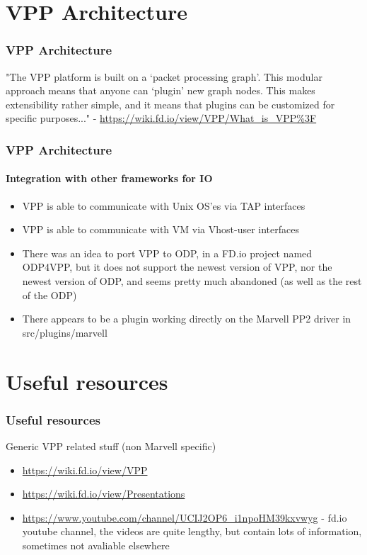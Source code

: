 \documentclass{beamer}
\begin{document}
\section{VPP Architecture}
  \begin{frame}
  \frametitle{VPP Architecture}
  "The VPP platform is built on a ‘packet processing graph’. This modular approach means that anyone can ‘plugin’ new graph nodes. This makes extensibility rather simple, and it means that plugins can be customized for specific purposes..." - \url{https://wiki.fd.io/view/VPP/What_is_VPP\%3F}
  \end{frame}
  
  \begin{frame}
  \frametitle{VPP Architecture}
  \framesubtitle{Integration with other frameworks for IO}
  \begin{itemize}
  \item VPP is able to communicate with Unix OS'es via TAP interfaces
  \item VPP is able to communicate with VM via Vhost-user interfaces
  \item There was an idea to port VPP to ODP, in a FD.io project named ODP4VPP, but it does not support
        the newest version of VPP, nor the newest version of ODP, and seems pretty much abandoned 
        {\tiny (as well as the rest of the ODP)}
  \item There appears to be a plugin working directly on the Marvell PP2 driver in src/plugins/marvell
  \end{itemize}
  \end{frame}
  
\section{Useful resources}
  \begin{frame}
  \frametitle{Useful resources}
  Generic VPP related stuff (non Marvell specific)
  \begin{itemize}
  \item \url{https://wiki.fd.io/view/VPP}
  \item \url{https://wiki.fd.io/view/Presentations}
  \item \url{https://www.youtube.com/channel/UCIJ2OP6_i1npoHM39kxvwyg} - fd.io youtube channel, the
                       videos are quite lengthy, but contain lots of information, sometimes
                       not avaliable elsewhere
  \end{itemize}
  \end{frame}
\end{document}
